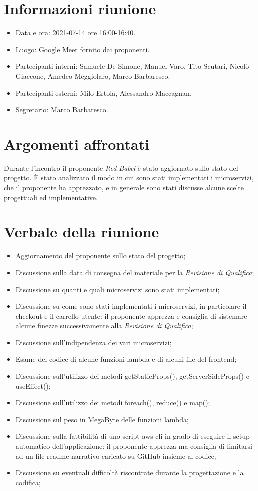 \documentclass[a4paper]{article}
\begin{document}
\newpage
\tableofcontents
\newpage

\section{Informazioni riunione}
\begin{itemize}
    \item Data e ora: 2021-07-14 ore 16:00-16:40.
    \item Luogo: Google Meet fornito dai proponenti.
    \item Partecipanti interni: Samuele De Simone, Manuel Varo, Tito Scutari, Nicolò Giaccone, Amedeo Meggiolaro, Marco Barbaresco.
    \item Partecipanti esterni: Milo Ertola, Alessandro Maccagnan.
    \item Segretario: Marco Barbaresco.
\end{itemize}
\section{Argomenti affrontati}
Durante l'incontro il proponente \textit{Red Babel} è stato aggiornato sullo stato del progetto. È stato analizzato il modo in cui sono stati
implementati i microservizi, che il proponente ha apprezzato, e in generale sono stati discusse alcune scelte progettuali ed implementative.
\section{Verbale della riunione}
\begin{itemize}
    \item Aggiornamento del proponente sullo stato del progetto;
    \item Discussione sulla data di consegna del materiale per la \textit{Revisione di Qualifica};
    \item Discussione su quanti e quali microservizi sono stati implementati;
    \item Discussione su come sono stati implementati i microservizi, in particolare il checkout e il carrello utente: il proponente apprezza e consiglia di sistemare
          alcune finezze successivamente alla \textit{Revisione di Qualifica};
    \item Discussione sull'indipendenza dei vari microservizi;
    \item Esame del codice di alcune funzioni lambda e di alcuni file del frontend;
    \item Discussione sull'utilizzo dei metodi getStaticProps(), getServerSideProps() e useEffect();
    \item Discussione sull'utilizzo dei metodi foreach(), reduce() e map();
    \item Discussione sul peso in MegaByte delle funzioni lambda;
    \item Discussione sulla fattibilità di uno script aws-cli in grado di eseguire il setup automatico dell'applicazione: il proponente apprezza ma consiglia di limitarsi ad un
          file readme narrativo caricato su GitHub insieme al codice;
    \item Discussione su eventuali difficoltà riscontrate durante la progettazione e la codifica;
\end{itemize}
\newpage
\end{document}
